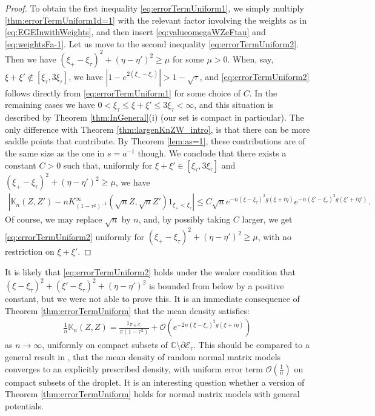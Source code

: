 \documentclass[%
 jmp,
cp,  %
 amsmath,amsthm,amssymb,%
 reprint,%
onecolumn]{revtex4-2}
\begin{document}
\begin{proof}
To obtain the first inequality \eqref{eq:errorTermUniform1}, we simply multiply \eqref{thm:errorTermUniform1d=1} with the relevant factor involving the weights as in \eqref{eq:EGEInwithWeights}, and then insert \eqref{eq:valueomegaWZeFtau} and \eqref{eq:weightsFa-1}. 
Let us move to the second inequality \eqref{eq:errorTermUniform2}. Then we have $(\xi_+ - \xi_\tau)^2+(\eta-\eta')^2\geq \mu$ for some $\mu>0$. When, say, $\xi+\xi' \not\in [\xi_\tau, 3\xi_\tau]$, we have $|1-e^{2(\xi_+-\xi_\tau)}|>1-\sqrt \tau$, and \eqref{eq:errorTermUniform2} follows directly from \eqref{eq:errorTermUniform1} for some choice of $C$. In the remaining cases we have $0<\xi_\tau \leq\xi+\xi' \leq 3\xi_\tau<\infty$, and this situation is described by Theorem \ref{thm:InGeneral}(i) (our set is compact in particular). The only difference with Theorem \ref{thm:largenKnZW_intro}, is that there can be more saddle points that contribute. By Theorem \ref{lem:as=1}, these contributions are of the same size as the one in $s=a^{-1}$ though. We conclude that there exists a constant $C>0$ such that, uniformly for $\xi+\xi'\in [\xi_\tau, 3\xi_\tau]$ and $(\xi_+ - \xi_\tau)^2+(\eta-\eta')^2\geq \mu$, we have
\begin{align*}
\left|\mathbb K_n(Z,Z') - n K_{(1-\tau^2)^{-1}}^{\infty}\left(\sqrt n Z, \sqrt n Z'\right) \mathfrak{1}_{\xi_+<\xi_\tau}\right|
\leq C\sqrt n e^{- n (\xi-\xi_\tau)^2 g(\xi+i\eta)} e^{- n (\xi'-\xi_\tau)^2 g(\xi'+i\eta')}.
\end{align*}
Of course, we may replace $\sqrt n$ by $n$, and, by possibly taking $C$ larger, we get \eqref{eq:errorTermUniform2} uniformly for $(\xi_+ - \xi_\tau)^2+(\eta-\eta')^2\geq \mu$, with no restriction on $\xi+\xi'$. 
\end{proof}

It is likely that \eqref{eq:errorTermUniform2} holds under the weaker condition that $(\xi - \xi_\tau)^2+(\xi' - \xi_\tau)^2+(\eta-\eta')^2$ is bounded from below by a positive constant, but we were not able to prove this. It is an immediate consequence of Theorem \ref{thm:errorTermUniform} that the mean density satisfies:
\begin{align} \label{eq:limitingDensityG}
    \frac{1}{n} \mathbb K_n(Z,Z) = \frac{\mathfrak{1}_{Z\in \mathcal E_\tau}}{\pi (1-\tau^2)} + \mathcal O\left(e^{- 2 n (\xi-\xi_\tau)^2 g(\xi+i\eta)}\right)
    \end{align}
as $n\to\infty$, uniformly on compact subsets of $\mathbb C\setminus \partial \mathcal E_\tau$. This should be compared to a general result in \cite{AmHeMa1}, that the mean density of random normal matrix models converges to an explicitly prescribed density, with uniform error term $\mathcal O\left(\frac{1}{n}\right)$ on compact subsets of the droplet. It is an interesting question whether a version of Theorem \ref{thm:errorTermUniform} holds for normal matrix models with general potentials. 
\end{document}
